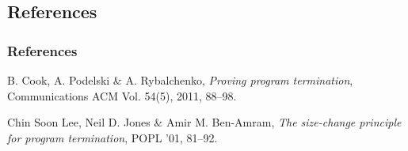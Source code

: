 \begin{frame}

\section{References}

\frametitle{References}

\begin{thebibliography}{2}

 B. Cook, A. Podelski \& A.  Rybalchenko,
\emph{Proving program termination}, Communications ACM Vol. 54(5), 2011,
88--98.

 Chin Soon Lee, Neil D. Jones \& Amir
M. Ben-Amram, \emph{The size-change principle for program termination}, POPL
'01, 81--92.

\end{thebibliography}

\end{frame}
